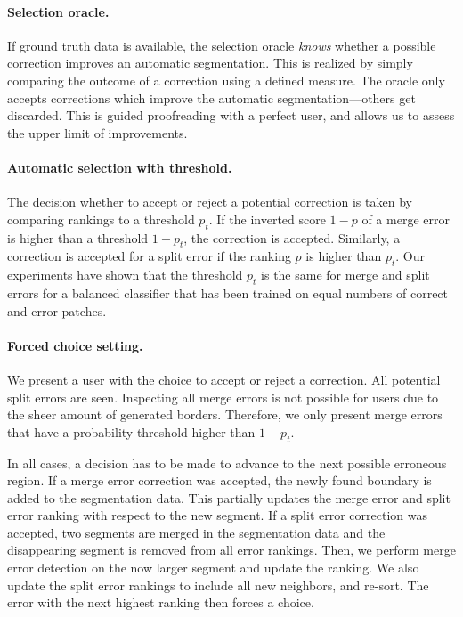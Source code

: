 \paragraph{Selection oracle.} If ground truth data is available, the selection oracle \textit{knows} whether a possible correction improves an automatic segmentation. This is realized by simply comparing the outcome of a correction using a defined measure. The oracle only accepts corrections which improve the automatic segmentation---others get
discarded. This is guided proofreading with a perfect user, and allows us to assess the upper limit of improvements.

\paragraph{Automatic selection with threshold.} The decision whether to accept or reject a potential correction is taken by comparing rankings to a threshold $p_t$. If the inverted score $1-p$ of a merge error is higher than a threshold $1-p_t$, the correction is accepted. Similarly, a correction is accepted for a split error if the ranking $p$ is higher than $p_t$. Our experiments have shown that the threshold $p_t$ is the same for merge and split errors for a balanced classifier that has been trained on equal numbers of correct and error patches.

\paragraph{Forced choice setting.} We present a user with the choice to accept or reject a correction. All potential split errors are seen. Inspecting all merge errors is not possible for users due to the sheer amount of generated borders. Therefore, we only present merge errors that have a probability threshold higher than $1-p_t$. 

\noindent \newline In all cases, a decision has to be made to advance to the next possible erroneous region. If a merge error correction was accepted, the newly found boundary is added to the segmentation data. This partially updates the merge error and split error ranking with respect to the new segment. If a split error correction was accepted, two segments are merged in the segmentation data and the disappearing segment is removed from all error rankings. Then, we perform merge error detection on the now larger segment and update the ranking. We also update the split error rankings to include all new neighbors, and re-sort. The error with the next highest ranking then forces a choice.

